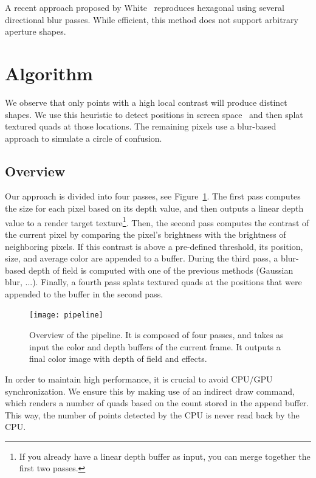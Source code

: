 A recent approach proposed by White~\cite{White11} reproduces hexagonal \bokeh using several directional blur passes. While efficient, this method does not support arbitrary aperture shapes.

\section{Algorithm}
We observe that only points with a high local contrast will produce distinct \bokeh shapes. We use this heuristic to detect \bokeh positions in screen space~\cite{Pettineo11} and then splat textured quads at those locations. The remaining pixels use a blur-based approach to simulate a circle of confusion.

\subsection{Overview}
Our approach is divided into four passes, see Figure~\ref{DeRousiers:pipeline}. The first pass computes the \coc size for each pixel based on its depth value, and then outputs a linear depth value to a render target texture\footnote{If you already have a linear depth buffer as input, you can merge together the first two passes.}. Then, the second pass computes the contrast of the current pixel by comparing the pixel's brightness with the brightness of neighboring pixels. If this contrast is above a pre-defined threshold, its position, \coc size, and average color are appended to a buffer. During the third pass, a blur-based depth of field is computed with one of the previous methods (Gaussian blur, ...). Finally, a fourth pass splats textured quads at the \bokeh positions that were appended to the buffer in the second pass.

	\begin{figure}[htb]\centering
	\texttt{[image: pipeline]}
	\caption{Overview of the pipeline. It is composed of four passes, and takes as input the color and depth buffers of the current frame. It outputs a final color image with depth of field and \bokeh effects.}
	\label{DeRousiers:pipeline}
	\end{figure}

In order to maintain high performance, it is crucial to avoid CPU/GPU synchronization. We ensure this by making use of an indirect draw command, which renders a number of quads based on the count stored in the append buffer. This way, the number of \bokeh points detected by the CPU is never read back by the CPU.

